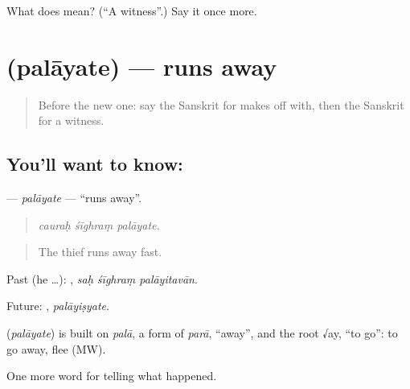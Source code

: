 \begin{tcolorbox}[breakable,colback=teal!4,colframe=teal!35!black,title={Before you move on}]
What does  mean? (\textquotedblleft{}A witness\textquotedblright{}.) Say it once more.
\end{tcolorbox}
\section[\texorpdfstring{\sk{पलायते} (palāyate)}{पलायते (palāyate)}]{ (palāyate) — runs away}

\label{lesson:SA-C286-palayate}



\begin{quote}
Before the new one: say the Sanskrit for makes off with, then the Sanskrit for a witness.
\end{quote}

\subsection*{You'll want to know: }
\textbf{} — \emph{palāyate} — \textquotedblleft{}runs away\textquotedblright{}.

\begin{quote}
  
\end{quote}

\begin{quote}
\emph{cauraḥ śīghraṃ palāyate.}
\end{quote}

\begin{quote}
The thief runs away fast.
\end{quote}

Past (he …):   , \emph{saḥ śīghraṃ palāyitavān}.

Future: , \emph{palāyiṣyate}.

\begin{cousinweb}
\textbf{} (\emph{palāyate}) is built on \emph{palā}, a form of \emph{parā}, \textquotedblleft{}away\textquotedblright{}, and the root √ay, \textquotedblleft{}to go\textquotedblright{}: to go away, flee (MW).
\end{cousinweb}

\begin{grammarlens}[title={What you've built}]
One more word for telling what happened.
\end{grammarlens}

